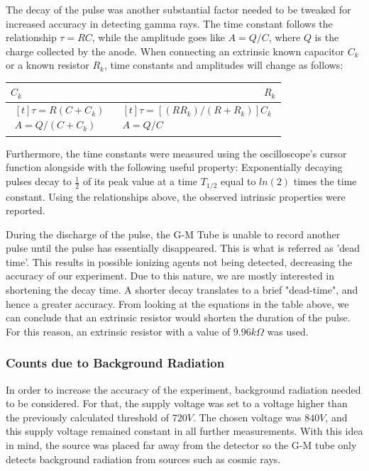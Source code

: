\documentclass[a4paper]{article}
\begin{document}
  The decay of the pulse was another substantial factor needed to be tweaked for increased accuracy in detecting gamma rays. The time constant follows the relationship $\tau=RC$, while the amplitude goes like $A=Q/C$, where $Q$ is the charge collected by the anode. When connecting an extrinsic known capacitor $C_k$ or a known resistor $R_k$, time constants and amplitudes will change as follows:
  
 \centering
  \begin{tabular}{lr}
$C_k$ & $R_k$\\
\hline
$\begin{aligned}[t]
\tau=R(C+C_k)\\
A=Q/(C+C_k)
\end{aligned}$ & $\begin{aligned}[t]
\tau=[(RR_k)/(R+R_k)]C_k\\
A=Q/C
\end{aligned}$ 
\end{tabular}
\justify

  Furthermore, the time constants were measured using the oscilloscope's cursor function alongside with the following useful property: Exponentially decaying pulses decay to $\frac{1}{2}$ of its peak value at a time $T_{1/2}$ equal to $ln (2)$ times the time constant. Using the relationships above, the observed intrinsic properties were reported.
  
  During the discharge of the pulse, the G-M Tube is unable to record another pulse until the pulse has essentially disappeared. This is what is referred as 'dead time'. This results in possible ionizing agents not being detected, decreasing the accuracy of our experiment. Due to this nature, we are mostly interested in shortening the decay time. A shorter decay translates to a brief "dead-time", and hence a greater accuracy. From looking at the equations in the table above, we can conclude that an extrinsic resistor would shorten the duration of the pulse. For this reason, an extrinsic resistor with a value of $9.96 k\Omega$ was used.
  
  \subsubsection{Counts due to Background Radiation}
  In order to increase the accuracy of the experiment, background radiation needed to be considered. For that, the supply voltage was set to a voltage higher than the previously calculated threshold of $720V$. The chosen voltage was $840V$, and this supply voltage remained constant in all further measurements. With this idea in mind, the source was placed far away from the detector so the G-M tube only detects background radiation from sources such as cosmic rays.
  
\end{document}
